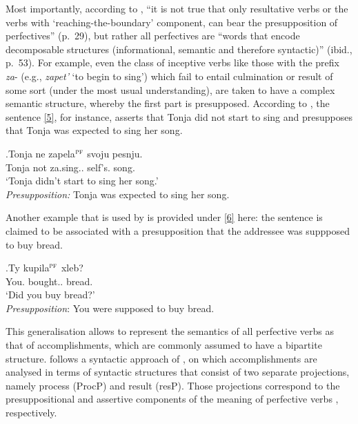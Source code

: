  Most importantly, according to \citet{Romanova:06}, ``it is not true that only resultative  verbs or the verbs with `reaching-the-boundary' component, can bear the presupposition of perfectives'' (p.~29), but rather all perfectives are ``words that encode decomposable structures (informational, semantic and therefore syntactic)'' (ibid., p.~53). For example, even the class of inceptive  verbs like those with the prefix \textit{za}-  (e.g., \textit{zapet'} `to begin to sing') which fail to entail culmination or result of some sort (under the most usual understanding), are taken to have a complex semantic structure, whereby the first part is presupposed. According to \citet{Romanova:06}, the sentence \ref{5}, for instance, asserts that Tonja did not start to sing and presupposes that Tonja was expected to sing her song.
 
\exg.\label{5}Tonja ne zapela$^{\textsc{pf}}$ svoju pesnju.\\
Tonja not za.sing.. self's. song.\\
\trans `Tonja didn't start to sing her song.'\\
\textit{Presupposition:} Tonja was expected to sing her song.\\

Another example that is used by \citet{Romanova:06} is provided under \ref{6} here: the sentence is claimed to be associated with a presupposition that the addressee was suppposed to buy bread.

\exg.\label{6}Ty kupila$^{\textsc{pf}}$ xleb?\\
You. bought.. bread.\\
\trans `Did you buy bread?'\\
\textit{Presupposition}: You were supposed to buy bread.\\

This generalisation allows \citet{Romanova:06} to represent the semantics of all perfective verbs  as that of accomplishments, which are commonly assumed to have a bipartite structure. \citet{Romanova:06} follows a syntactic approach of \citet{Ramchand:04}, on which accomplishments are analysed in terms of syntactic structures that consist of two separate projections, namely process (ProcP) and result (resP). Those projections correspond to the presuppositional and assertive components of the meaning of perfective verbs , respectively. 

